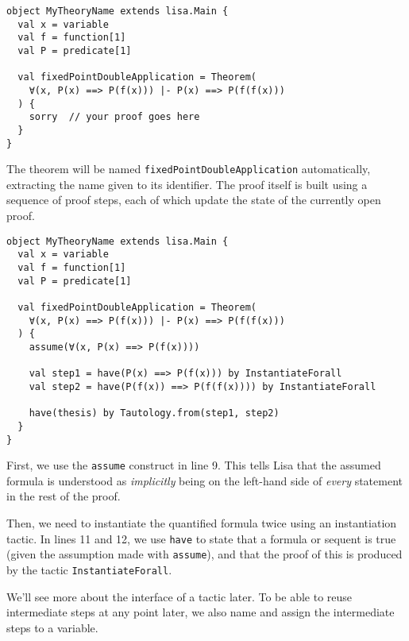 \noindent
\begin{minipage}{\linewidth}\vspace{0.5em}
\begin{lstlisting}[language=lisa, frame=single]
object MyTheoryName extends lisa.Main {
  val x = variable
  val f = function[1]
  val P = predicate[1]

  val fixedPointDoubleApplication = Theorem(
    ∀(x, P(x) ==> P(f(x))) |- P(x) ==> P(f(f(x)))
  ) {
    sorry  // your proof goes here
  }
}
\end{lstlisting}
\end{minipage}
%
The theorem will be named \lstinline|fixedPointDoubleApplication| automatically,
extracting the name given to its identifier. The proof itself is built using a
sequence of proof steps, each of which update the state of the currently open
proof.

\noindent
\begin{minipage}{\linewidth}\vspace{0.5em}
\begin{lstlisting}[language=lisa, frame=single]
object MyTheoryName extends lisa.Main {
  val x = variable
  val f = function[1]
  val P = predicate[1]

  val fixedPointDoubleApplication = Theorem(
    ∀(x, P(x) ==> P(f(x))) |- P(x) ==> P(f(f(x)))
  ) {
    assume(∀(x, P(x) ==> P(f(x))))

    val step1 = have(P(x) ==> P(f(x))) by InstantiateForall
    val step2 = have(P(f(x)) ==> P(f(f(x)))) by InstantiateForall

    have(thesis) by Tautology.from(step1, step2)
  }
}
\end{lstlisting}
\end{minipage}

First, we use the \lstinline|assume| construct in line 9. This tells Lisa that
the assumed formula is understood as \emph{implicitly} being on the left-hand
side of \emph{every} statement in the rest of the proof.

Then, we need to instantiate the quantified formula twice using an instantiation
tactic. In lines 11 and 12, we use \lstinline|have| to state that a formula or
sequent is true (given the assumption made with \lstinline|assume|), and that the
proof of this is produced by the tactic \lstinline|InstantiateForall|.

We'll see more about the interface of a tactic later. To be able to reuse
intermediate steps at any point later, we also name and assign the intermediate
steps to a variable.

